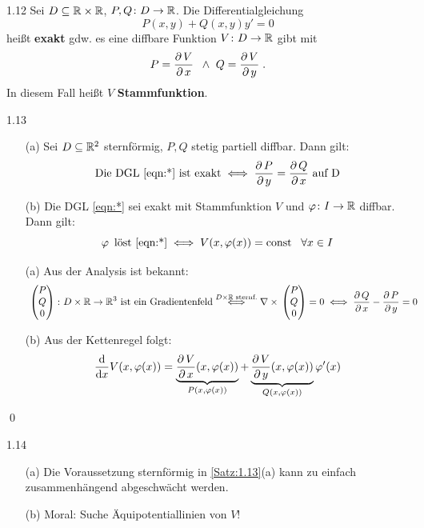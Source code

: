 \documentclass[a4paper]{article}
\begin{document}
\begin{Def}{}{1.12}
Sei $D\subseteq\mathbb R\times \mathbb R$, $P,Q\colon D\to\mathbb R$. Die Differentialgleichung 
\[
P(x,y)+Q(x,y)y'=0\tag{$*$}\label{eqn:*}
\]
heißt \textbf{exakt} gdw. es eine diffbare Funktion $V\colon D\to\mathbb R$ gibt mit
\[P=\frac{\operatorname{\partial} V}{\operatorname{\partial} x}\;\;\wedge\,\,Q=\frac{\operatorname{\partial} V}{\operatorname{\partial} y}\;.\]
In diesem Fall heißt $V$ \textbf{Stammfunktion}.
\end{Def}
\begin{Satz}{}{1.13}
\begin{itemize}
    \item[(a)] Sei $D\subseteq \mathbb R^2$ sternförmig, $P,Q$ stetig partiell diffbar. Dann gilt:
    \[\text{Die DGL \eqref{eqn:*} ist exakt}\iff \frac{\operatorname{\partial} P}{\operatorname{\partial} y}=\frac{\operatorname{\partial} Q}{\operatorname{\partial} x}\text{ auf D}\]
    \item[(b)] Die  DGL \eqref{eqn:*} sei exakt mit Stammfunktion $V$ und $\operatorname{\varphi}\colon I\to\mathbb R$ diffbar. Dann gilt:
    \[\operatorname{\varphi}\text{ löst \eqref{eqn:*}}\iff V(x,\operatorname{\varphi}(x))=\mathrm{const}\;\;\;\forall x\in I\]
\end{itemize}
\end{Satz}

\begin{Beweis}
\begin{itemize}
\item[(a)] Aus der Analysis ist bekannt:
\begin{align*}
&\mathop{}\begin{pmatrix}P\\Q\\0\end{pmatrix}\colon D\times \mathbb R\to\mathbb R^3\text{ ist ein Gradientenfeld}
\overset{D\times \mathbb R\text{ sternf.}}{\iff} \nabla\times \mathop{}\begin{pmatrix}P\\Q\\0\end{pmatrix}=0
\iff \frac{\operatorname{\partial} Q}{\operatorname{\partial} x}-\frac{\operatorname{\partial} P}{\operatorname{\partial} y}=0
\end{align*}
\item[(b)] Aus der Kettenregel folgt:
\[\frac{\mathop{}\!\mathrm{d}}{\mathop{}\!\mathrm{d} x}V(x,\operatorname{\varphi}(x))=\underbrace{\frac{\operatorname{\partial} V}{\operatorname{\partial} x}(x,\operatorname{\varphi}(x))}_{P(x,\operatorname{\varphi}(x))}+\underbrace{\frac{\operatorname{\partial} V}{\operatorname{\partial} y}(x,\operatorname{\varphi}(x))}_{Q(x,\operatorname{\varphi}(x))}\operatorname{\varphi}'(x)\]
\end{itemize}
\qed
\end{Beweis}

\begin{Bemerkung}{}{1.14}
\begin{itemize}
    \item[(a)] Die Voraussetzung \glqq sternförmig\grqq{} in \ref{Satz:1.13}(a) kann zu \glqq einfach zusammenhängend\grqq{} abgeschwächt werden.
    \item[(b)] Moral: Suche Äquipotentiallinien von $V$!
\end{itemize}
\end{Bemerkung}
\end{document}
